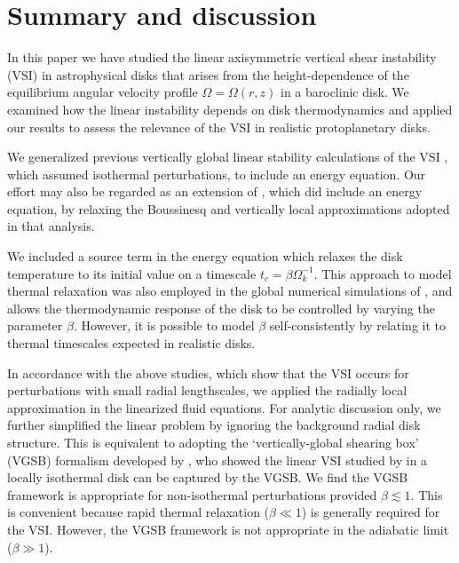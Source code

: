 \section{Summary and discussion}\label{summary}
In this paper we have studied the linear axisymmetric vertical shear
instability (VSI) in astrophysical disks that arises from the
height-dependence of the equilibrium angular velocity profile
$\Omega=\Omega(r,z)$ in a baroclinic disk. We examined how
the linear instability depends on disk thermodynamics and applied our
results to assess the relevance of the VSI in realistic protoplanetary
disks.  


We generalized previous vertically global linear stability calculations
of the VSI \citep{nelson13,mcnally14}, which assumed isothermal
perturbations, to include an energy equation. Our effort may also be
regarded as an extension of \cite{urpin03}, which did include an
energy equation, by relaxing the Boussinesq and vertically local
approximations adopted in that analysis.      

We included a source term in the energy equation which relaxes the disk
temperature to its initial value on a timescale
$t_c=\beta\Omega_k^{-1}$. This approach to model thermal relaxation was also
employed in the global numerical simulations of \cite{nelson13}, and
allows the thermodynamic response of the disk to be controlled by
varying the parameter $\beta$. However, it is possible to model
$\beta$ self-consistently by relating it to thermal timescales
expected in realistic disks.  

In accordance with the above studies, which show that the VSI occurs for 
perturbations with small radial lengthscales, we applied the 
radially local approximation in the linearized fluid equations. For
analytic discussion only, we further simplified the linear problem by
ignoring the background radial disk structure. This is equivalent to adopting
the `vertically-global shearing box' (VGSB) formalism developed by
\cite{mcnally14}, who showed the linear VSI studied by
\cite{nelson13} in a locally isothermal disk can be captured by the
VGSB. We find the VGSB framework is appropriate for non-isothermal
perturbations provided $\beta\lesssim1$.  
This is convenient because rapid thermal relaxation ($\beta\ll1$) is
generally required for the VSI.  However, the VGSB framework is not
appropriate in the adiabatic limit ($\beta \gg 1$). 
   
